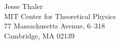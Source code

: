 Jesse Thaler\\
MIT Center for Theoretical Physics\\
77 Massachusetts Avenue, 6--318\\
Cambridge, MA 02139
